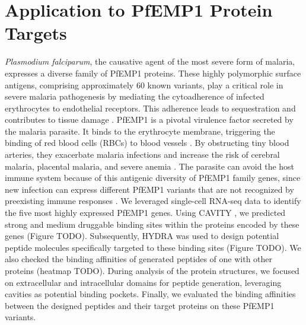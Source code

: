 \section{Application to PfEMP1 Protein Targets}
\textit{Plasmodium falciparum}, the causative agent of the most severe form of malaria, expresses a diverse family of PfEMP1 proteins. These highly polymorphic surface antigens, comprising approximately 60 known variants, play a critical role in severe malaria pathogenesis by mediating the cytoadherence of infected erythrocytes to endothelial receptors. This adherence leads to sequestration and contributes to tissue damage \cite{jensen2020cerebral}. PfEMP1 is a pivotal virulence factor secreted by the malaria parasite. It binds to the erythrocyte membrane, triggering the binding of red blood cells (RBCs) to blood vessels \cite{pasternak2009pfemp1}. By obstructing tiny blood arteries, they exacerbate malaria infections and increase the risk of cerebral malaria, placental malaria, and severe anemia \cite{jensen2020cerebral}. The parasite can avoid the host immune system because of this antigenic diversity of PfEMP1 family genes, since new infection can express different PfEMP1 variants that are not recognized by preexisting immune responses \cite{scherf2008antigenic}.
We leveraged single-cell RNA-seq data to identify the five most highly expressed PfEMP1 genes. Using CAVITY \cite{Yuan2013}, we predicted strong and medium druggable binding sites within the proteins encoded by these genes (Figure TODO). Subsequently, HYDRA was used to design potential peptide molecules specifically targeted to these binding sites (Figure TODO). We also checked the binding affinities of generated peptides of one with other proteins (heatmap TODO).  During analysis of the protein structures, we focused on extracellular and intracellular domains for peptide generation, leveraging cavities as potential binding pockets. Finally, we evaluated the binding affinities between the designed peptides and their target proteins on these PfEMP1 variants.
